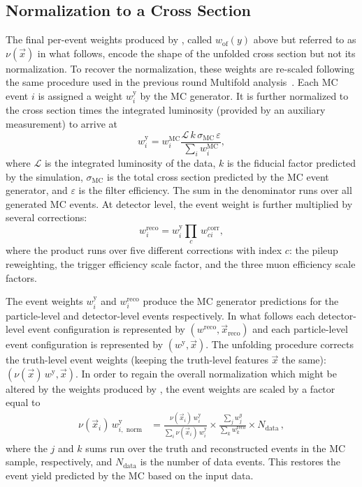 \FloatBarrier

\subsection{Normalization to a Cross Section}
\label{sec:zjets-method-norm}

The final per-event weights produced by \Omnifold, called $w_{\textrm{of}}(y)$ above but referred to as $\nu(\vec{x})$ in what follows, encode the shape of the unfolded cross section but not its normalization.
To recover the normalization, these weights are re-scaled following the same procedure used in the previous round Multifold analysis~\cite{ATLAS:2024xxl}.
Each MC event $i$ is assigned a weight $w_i^\mathrm{y}$ by the MC generator.
It is further normalized to the cross section times the integrated luminosity (provided by an auxiliary measurement) to arrive at
\begin{equation}
    \label{eq:mc-norm}
    w^\mathrm{y}_i = w^\mathrm{MC}_i \frac{\mathcal{L}\,k\,\sigma_\mathrm{MC}\,\varepsilon}{\sum_i w^\mathrm{MC}_i},
  \end{equation}
where $\mathcal{L}$ is the integrated luminosity of the data, $k$ is the fiducial factor predicted by the simulation, $\sigma_\mathrm{MC}$ is the total cross section predicted by the MC event generator, and $\varepsilon$ is the filter efficiency.
The sum in the denominator runs over all generated MC events.
At detector level, the event weight is further multiplied by several corrections:
\begin{equation}
  \label{eq:mc-norm-reco}
  w^\mathrm{reco}_i = w^\mathrm{y}_i \prod_c\,w^\mathrm{corr}_{ci},
\end{equation}
where the product runs over five different corrections with index $c$: the pileup reweighting, the trigger efficiency scale factor, and the three muon efficiency scale factors.

The event weights $w^\mathrm{y}_i$ and $w^\mathrm{reco}_i$ produce the MC generator predictions for the particle-level and detector-level events respectively.
In what follows each detector-level event configuration is represented by $(w^\mathrm{reco},\vec{x}_\mathrm{reco})$ and each particle-level event configuration is represented by $(w^\mathrm{y},\vec{x})$.
The unfolding procedure corrects the truth-level event weights (keeping the truth-level features $\vec{x}$ the same): $(\nu(\vec{x})\,w^\mathrm{y},\vec{x})$.
In order to regain the overall normalization which might be altered by the weights produced by \Omnifold, the event weights are scaled by a factor equal to
\begin{align}
  \nu(\vec{x}_i)\,w^\mathrm{y}_{i,\text{ norm}}&=\frac{\nu(\vec{x}_i)\,w^\mathrm{y}_{i}}{\sum_i \nu(\vec{x}_i)\,w^\mathrm{y}_{i}}\times\frac{\sum_j w^y_j}{\sum_k w^\text{reco}_k}\times N_\text{data}\,,
\end{align}
where the $j$ and $k$ sums run over the truth and reconstructed events in the MC sample, respectively, and $N_\text{data}$ is the number of data events.
This restores the event yield predicted by the MC based on the input data.

